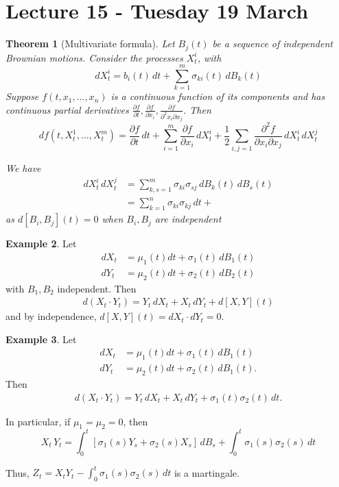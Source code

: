 \documentclass[10pt, oneside, reqno]{amsart}
\theoremstyle{plain}%
\newtheorem{thm}{Theorem}[section]
\theoremstyle{definition}
\newtheorem{exmp}[thm]{Example}
\theoremstyle{remark}
\begin{document}
\section{Lecture 15 - Tuesday 19 March} %
\label{sec:lecture_15_tuesday_19_march}

\begin{thm}[Multivariate \itos formula]
	Let $B_j(t)$ be a sequence of independent Brownian motions.  Consider the \ito processes $X_t^i$, with \[
		dX_t^i = b_i(t) \, dt + \sum_{k=1}^m \sigma_{ki}(t) \, dB_k(t)
	\]  Suppose $f(t, x_1, \dots, x_n)$ is a continuous function of its components and has continuous partial derivatives $\frac{\partial f}{\partial t}, \frac{\partial f}{\partial x_i}, \frac{\partial f}{\partial^2 x_i \partial x_j}$.  Then \[
		df(t, X_t^1, \dots, X_t^m) = \frac{\partial f}{\partial t} \, dt + \sum_{i=1}^m \frac{\partial f}{\partial x_i} \, dX_t^i + \frac{1}{2} \sum_{i, j = 1} \frac{\partial^2 f}{\partial x_i \partial x_j} \, dX_t^i \, dX_t^j
	\]
	
	We have \begin{align*}
		dX_t^i \, dX_t^j 	&= \sum_{k, s = 1}^m \sigma_{ki} \sigma_{sj} \, dB_k(t) \, dB_{s}(t) \\
							&= \sum_{k=1}^n \sigma_{ki}\sigma_{kj} \, dt + 
	\end{align*} as $d[B_i, B_j](t) = 0$ when $B_i, B_j$ are independent 
\end{thm}

\begin{exmp}
	Let \begin{align*}
		dX_t &= \mu_1(t) dt + \sigma_1(t) \, dB_1(t) \\
		dY_t &= \mu_2(t) dt + \sigma_2(t) \, dB_2(t)
	\end{align*} with $B_1, B_2$ independent. Then \begin{align*}
		d(X_t \cdot Y_t) = Y_t \, dX_t + X_t \, dY_t + d[X,Y](t)
	\end{align*} and by independence, $d[X,Y](t) = dX_t \cdot dY_t = 0$.
\end{exmp}

\begin{exmp}
	Let \begin{align*}
		dX_t &= \mu_1(t) dt + \sigma_1(t) \, dB_1(t) \\
		dY_t &= \mu_2(t) dt + \sigma_2(t) \, dB_1(t).
	\end{align*} Then \begin{align*}
		d(X_t \cdot Y_t) = Y_t \, dX_t + X_t \, dY_t + \sigma_1(t) \sigma_2(t) \, dt.
	\end{align*}
	
	In particular, if $\mu_1 = \mu_2 = 0$, then \[
		X_t \, Y_t = \int_0^t [ \sigma_1(s) Y_s + \sigma_2(s) X_s] \, dB_s + \int_0^t \sigma_1(s) \sigma_2(s) \, dt
	\]  
	
	Thus, $Z_t = X_t Y_t - \int_0^t \sigma_1(s) \sigma_2(s) \, dt$ is a martingale.
\end{exmp}
\end{document}

